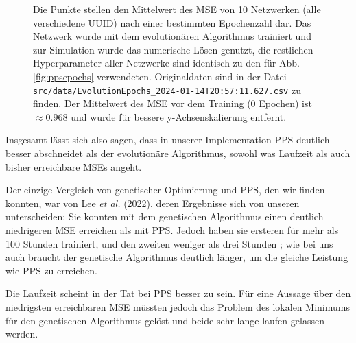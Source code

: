 \documentclass[10pt]{scrartcl}
\newcommand{\filepath}[1]{\texttt{#1}}
\newcommand{\lee}{Lee {\itshape et al.} (2022)}
\begin{document}
\begin{figure}[H]
    \centering
    \Data
    \caption{Die Punkte stellen den Mittelwert des MSE von 10 Netzwerken (alle verschiedene UUID) nach einer bestimmten Epochenzahl dar. Das Netzwerk wurde mit dem evolutionären Algorithmus trainiert und zur Simulation wurde das numerische Lösen genutzt, die restlichen Hyperparameter aller Netzwerke sind identisch zu den für Abb. \ref{fig:ppsepochs} verwendeten. 
    Originaldaten sind in der Datei \filepath{src/data/EvolutionEpochs\_2024-01-14T20:57:11.627.csv} zu finden. Der Mittelwert des MSE vor dem Training (0 Epochen) ist $\approx \num{0.968}$ und wurde für bessere y-Achsenskalierung entfernt.}
    \label{fig:evolutionepochs}
\end{figure}

Insgesamt lässt sich also sagen, dass in unserer Implementation PPS deutlich besser abschneidet als der evolutionäre Algorithmus, sowohl was Laufzeit als auch bisher erreichbare MSEs angeht.

Der einzige Vergleich von genetischer Optimierung und PPS, den wir finden konnten, war von \lee{}, deren Ergebnisse sich von unseren unterscheiden: Sie konnten mit dem genetischen Algorithmus einen deutlich niedrigeren MSE erreichen als mit PPS. Jedoch haben sie ersteren für mehr als 100 Stunden trainiert, und den zweiten weniger als drei Stunden \cite[Abb. 4]{Lee2022}; wie bei uns auch braucht der genetische Algorithmus deutlich länger, um die gleiche Leistung wie PPS zu erreichen.

Die Laufzeit scheint in der Tat bei PPS besser zu sein. Für eine Aussage über den niedrigsten erreichbaren MSE müssten jedoch das Problem des lokalen Minimums für den genetischen Algorithmus gelöst und beide sehr lange laufen gelassen werden. 
\end{document}
